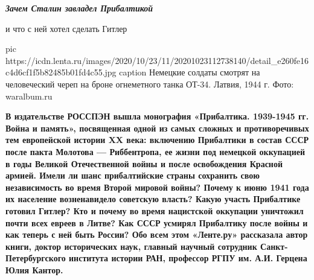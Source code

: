  
 
 
 
 

\begin{center}
	\em\bfseries\color{red}\huge 
	Зачем Сталин завладел Прибалтикой\par и что с ней хотел сделать Гитлер
\end{center}

\ifcmt
pic https://icdn.lenta.ru/images/2020/10/23/11/20201023112738140/detail_e260fe16c4d6cf1f5b82485b01fd4c55.jpg
caption Немецкие солдаты смотрят на человеческий череп на броне огнеметного танка ОТ-34. Латвия, 1944 г. Фото: waralbum.ru
\fi

\def\lenta#1{\textbf{\em\color{blue} #1}}

\begin{leftbar}
	\bfseries
В издательстве РОССПЭН вышла монография «Прибалтика. 1939-1945 гг. Война и
память», посвященная одной из самых сложных и противоречивых тем европейской
истории XX века: включению Прибалтики в состав СССР после пакта Молотова —
Риббентропа, ее жизни под немецкой оккупацией в годы Великой Отечественной
войны и после освобождения Красной армией. Имели ли шанс прибалтийские страны
сохранить свою независимость во время Второй мировой войны? Почему к июню 1941
года их население возненавидело советскую власть? Какую участь Прибалтике
готовил Гитлер? Кто и почему во время нацистской оккупации уничтожил почти всех
евреев в Литве? Как СССР усмирял Прибалтику после войны и как теперь с ней быть
России? Обо всем этом «Ленте.ру» рассказала автор книги, доктор исторических
наук, главный научный сотрудник Санкт-Петербургского института истории РАН,
профессор РГПУ им. А.И. Герцена Юлия Кантор.
\end{leftbar}

